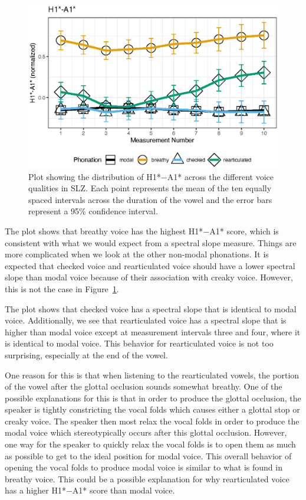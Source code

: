 \begin{figure}[h!]
    \centering
    \includegraphics[width = 0.9\linewidth]{images/h1a1_line.eps}
    \caption{Plot showing the distribution of H1*$-$A1* across the different voice qualities in SLZ. Each point represents the mean of the ten equally spaced intervals across the duration of the vowel and the error bars represent a 95\% confidence interval.}
    \label{fig:h1a1}
\end{figure}

The plot shows that breathy voice has the highest H1*$-$A1* score, which is consistent with what we would expect from a spectral slope measure. Things are more complicated when we look at the other non-modal phonations. It is expected that checked voice and rearticulated voice should have a lower spectral slope than modal voice because of their association with creaky voice. However, this is not the case in Figure~\ref{fig:h1a1}. 

The plot shows that checked voice has a spectral slope that is identical to modal voice. Additionally, we see that rearticulated voice has a spectral slope that is higher than modal voice except at measurement intervals three and four, where it is identical to modal voice. This behavior for rearticulated voice is not too surprising, especially at the end of the vowel. 

One reason for this is that when listening to the rearticulated vowels, the portion of the vowel after the glottal occlusion sounds somewhat breathy. One of the possible explanations for this is that in order to produce the glottal occlusion, the speaker is tightly constricting the vocal folds which causes either a glottal stop or creaky voice. The speaker then most relax the vocal folds in order to produce the modal voice which stereotypically occurs after this glottal occlusion. However, one way for the speaker to quickly relax the vocal folds is to open them as much as possible to get to the ideal position for modal voice. This overall behavior of opening the vocal folds to produce modal voice is similar to what is found in breathy voice. This could be a possible explanation for why rearticulated voice has a higher H1*$-$A1* score than modal voice.

